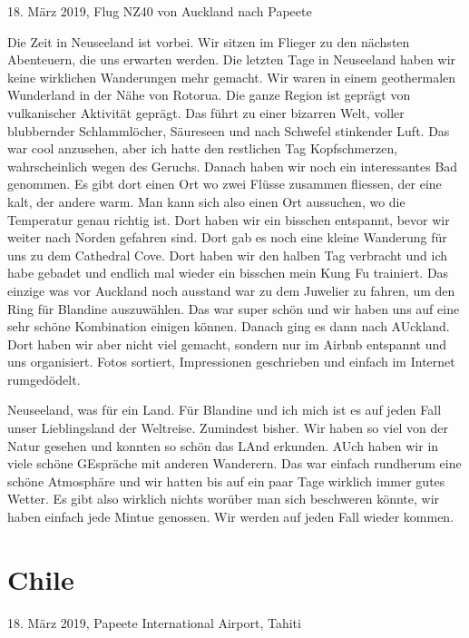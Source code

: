 \documentclass[11pt]{book}
\begin{document}
18. März 2019, Flug NZ40 von Auckland nach Papeete

Die Zeit in Neuseeland ist vorbei. Wir sitzen im Flieger zu den nächsten Abenteuern, die uns erwarten werden. Die letzten Tage in 
Neuseeland haben wir keine wirklichen Wanderungen mehr gemacht. Wir waren in einem geothermalen Wunderland in der Nähe von Rotorua.
Die ganze Region ist geprägt von vulkanischer Aktivität geprägt. Das führt zu einer bizarren Welt, voller blubbernder Schlammlöcher,
Säureseen und nach Schwefel stinkender Luft. Das war cool anzusehen, aber ich hatte den restlichen Tag Kopfschmerzen, wahrscheinlich 
wegen des Geruchs. Danach haben wir noch ein interessantes Bad genommen. Es gibt dort einen Ort wo zwei Flüsse zusammen fliessen, 
der eine kalt, der andere warm. Man kann sich also einen Ort aussuchen, wo die Temperatur genau richtig ist. Dort haben wir ein bisschen 
entspannt, bevor wir weiter nach Norden gefahren sind. Dort gab es noch eine kleine Wanderung für uns zu dem Cathedral Cove. Dort 
haben wir den halben Tag verbracht und ich habe gebadet und endlich mal wieder ein bisschen mein Kung Fu trainiert. Das einzige was 
vor Auckland noch ausstand war zu dem Juwelier zu fahren, um den Ring für Blandine auszuwählen. Das war super schön und wir haben 
uns auf eine sehr schöne Kombination einigen können. Danach ging es dann nach AUckland. Dort haben wir aber nicht viel gemacht, sondern 
nur im Airbnb entspannt und uns organisiert. Fotos sortiert, Impressionen geschrieben und einfach im Internet rumgedödelt. 


Neuseeland, was für ein Land. Für Blandine und ich mich ist es auf jeden Fall unser Lieblingsland der Weltreise. Zumindest bisher. 
Wir haben so viel von der Natur gesehen und konnten so schön das LAnd erkunden. AUch haben wir in viele schöne GEspräche mit anderen 
Wanderern. Das war einfach rundherum eine schöne Atmosphäre und wir hatten bis auf ein paar Tage wirklich immer gutes Wetter. Es gibt 
also wirklich nichts worüber man sich beschweren könnte, wir haben einfach jede Mintue genossen. Wir werden auf jeden Fall wieder 
kommen.


\chapter{Chile}


18. März 2019, Papeete International Airport, Tahiti
\end{document}
